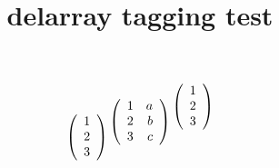 \documentclass{article}
\title{delarray tagging test}
\begin{document}
\[
\begin{array}[t]({c}) 1\\2\\3 \end{array}
\begin{array}[c]({cr}) 1 & a\\2 & b\\3 & c \end{array}
\begin{array}[b]({c}) 1\\2\\3 \end{array}
\]
\end{document}
